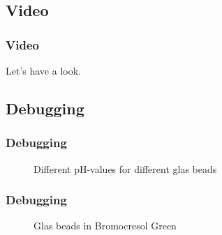 \subsection{Video}
\begin{frame}
	\frametitle{Video}
	\vspace{1cm} %
	
	\centering
	Let's have a look.
 
\end{frame}


\subsection{Debugging}
\begin{frame}
	\frametitle{Debugging}
	\vspace{1cm} %
	\begin{figure}
	  \centering
	  \begin{minipage}[t]{0.45\textwidth}
	  \end{minipage}
	  \begin{minipage}[t]{0.45\textwidth}
	  \end{minipage}
	  \caption{Different pH-values for different glas beads}
	\end{figure}
 
\end{frame}


\begin{frame}
	\frametitle{Debugging}
	\vspace{1cm} %
	\begin{figure}
	  \centering
	  \begin{minipage}[t]{0.3\textwidth}
	  \end{minipage}
	  \begin{minipage}[t]{0.3\textwidth}
	  \end{minipage}
	  \begin{minipage}[t]{0.3\textwidth}
	  \end{minipage}
	  
	  \caption{Glas beads in Bromocresol Green}
	\end{figure}
 
\end{frame}


